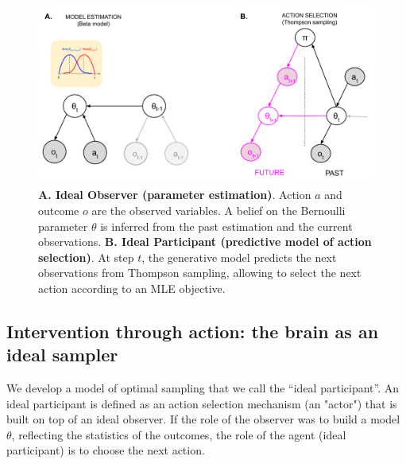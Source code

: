 \documentclass[10pt,letterpaper]{article}
\begin{document}
\begin{figure}[h]
\centering
\includegraphics[width=\textwidth]{figs/graphical model.pdf}
\caption{{\bf A. Ideal Observer (parameter estimation)}. Action $a$ and outcome $o$ are the observed variables. A belief on the Bernoulli parameter $\theta$ is inferred from the past estimation and the current observations. {\bf B. Ideal Participant (predictive model of action selection)}. At step $t$, the generative model predicts the next observations from Thompson sampling, allowing to select the next action according to an MLE objective.}
\label{fig:1}
\end{figure}
\subsection{Intervention through action: the brain as an ideal sampler}

We  develop a model of optimal sampling that we call the ``ideal participant''. An ideal participant is defined as an action selection mechanism (an "actor") that is built on top of an ideal observer.
If the role of the observer was to build a  model $\theta$, reflecting the statistics of the outcomes, %
the role of the agent (ideal participant) is to choose the next action.
\end{document}
